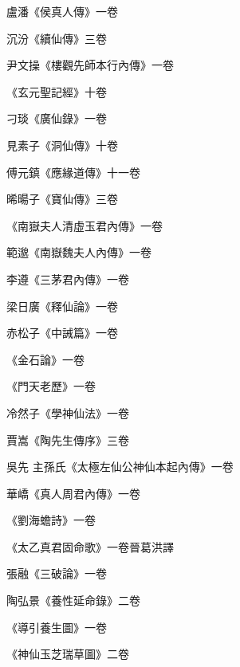 \begin{pinyinscope}
 盧潘《侯真人傳》一卷



 沉汾《續仙傳》三卷



 尹文操《樓觀先師本行內傳》一卷



 《玄元聖記經》十卷



 刁琰《廣仙錄》一卷



 見素子《洞仙傳》十卷



 傅元鎮《應緣道傳》十一卷



 晞暘子《寶仙傳》三卷



 《南嶽夫人清虛玉君內傳》一卷



 範邈《南嶽魏夫人內傳》一卷



 李遵《三茅君內傳》一卷



 梁日廣《釋仙論》一卷



 赤松子《中誡篇》一卷



 《金石論》一卷



 《門天老歷》一卷



 冷然子《學神仙法》一卷



 賈嵩《陶先生傳序》三卷



 吳先
 主孫氏《太極左仙公神仙本起內傳》一卷



 華嶠《真人周君內傳》一卷



 《劉海蟾詩》一卷



 《太乙真君固命歌》一卷晉葛洪譯



 張融《三破論》一卷



 陶弘景《養性延命錄》二卷



 《導引養生圖》一卷



 《神仙玉芝瑞草圖》二卷




\end{pinyinscope}
